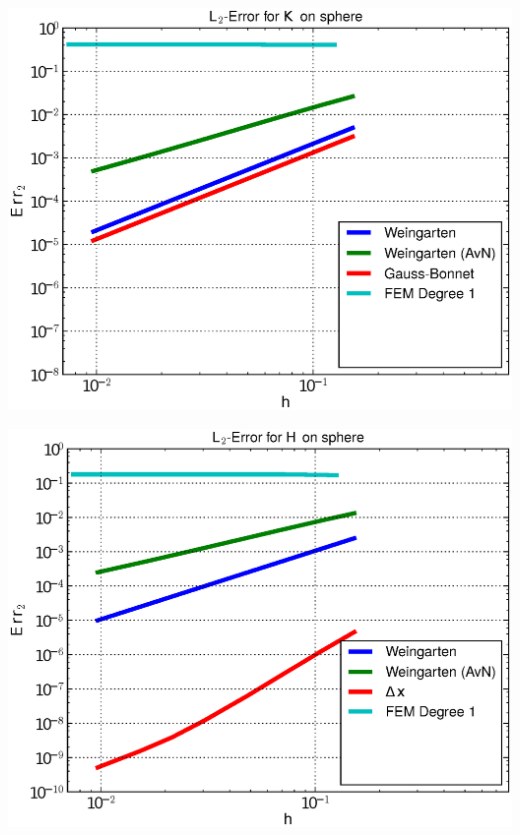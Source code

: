 \documentclass[handout]{beamer}
\begin{document}
\begin{frame}
\begin{overprint}
\begin{minipage}[t]{0.49\textwidth}
            \centering\includegraphics[width=\textwidth]{bilder/Curvature/sphere/ErrKL2_4.eps}
          \end{minipage}\hfill
          \begin{minipage}[t]{0.49\textwidth}
            \centering\includegraphics[width=\textwidth]{bilder/Curvature/sphere/ErrHL2_4.eps}
          \end{minipage}
          \begin{minipage}[t]{0.49\textwidth}

\end{minipage}
\end{overprint}
\end{frame}
\end{document}
